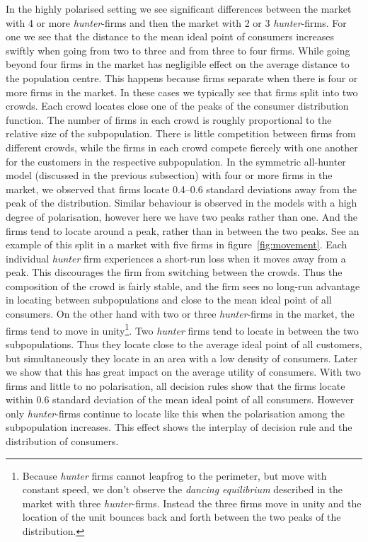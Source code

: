 \documentclass[preprint, 12pt]{elsarticle}
\begin{document}
In the highly polarised setting we see significant differences between the market with 4 or more \emph{hunter}-firms and then the market with 2 or 3 \emph{hunter}-firms. For one we see that the distance to the mean ideal point of consumers increases swiftly when going from two to three and from three to four firms. While going beyond four firms in the market has negligible effect on the average distance to the population centre. This happens because firms separate when there is four or more firms in the market. In these cases we typically see that firms split into two crowds. Each crowd locates close one of the peaks of the consumer distribution function. The number of firms in each crowd is roughly proportional to the relative size of the subpopulation. There is little competition between firms from different crowds, while the firms in each crowd compete fiercely with one another for the customers in the respective subpopulation. In the symmetric all-hunter model (discussed in the previous subsection) with four or more firms in the market, we observed that firms locate 0.4–0.6 standard deviations away from the peak of the distribution. Similar behaviour is observed in the models with a high degree of polarisation, however here we have two peaks rather than one. And the firms tend to locate around a peak, rather than in between the two peaks. See an example of this split in a market with five firms in figure~\ref{fig:movement}. Each individual \emph{hunter} firm experiences a short-run loss when it moves away from a peak. This discourages the firm from switching between the crowds. Thus the composition of the crowd is fairly stable, and the firm sees no long-run advantage in locating between subpopulations and close to the mean ideal point of all consumers. On the other hand with two or three \emph{hunter}-firms in the market, the firms tend to move in unity\footnote{Because \emph{hunter} firms cannot leapfrog to the perimeter, but move with constant speed, we don't observe the \emph{dancing equilibrium} described \citet{Eaton_Lipsey_1975} in the market with three \emph{hunter}-firms. Instead the three firms move in unity and the location of the unit bounces back and forth between the two peaks of the distribution.}. Two \emph{hunter} firms tend to locate in between the two subpopulations. Thus they locate close to the average ideal point of all customers, but simultaneously they locate in an area with a low density of consumers. Later we show that this has great impact on the average utility of consumers. With two firms and little to no polarisation, all decision rules show that the firms locate within 0.6 standard deviation of the mean ideal point of all consumers. However only \emph{hunter}-firms continue to locate like this when the polarisation among the subpopulation increases. This effect shows the interplay of decision rule and the distribution of consumers.
\end{document}
